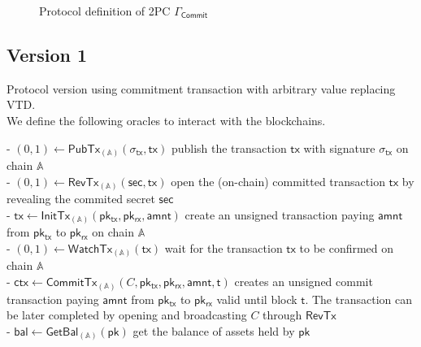 \documentclass{article}      	%
\begin{document}
\begin{figure}[H]
\begin{pchstack}
\end{pchstack}
\caption{Protocol definition of 2PC $\Gamma_{\mathsf{Commit}}$}
\end{figure}

\subsection{Version 1}

Protocol version using commitment transaction with arbitrary value replacing VTD. \\
We define the following oracles to interact with the blockchains. \\

- $(0,1) \leftarrow \mathsf{PubTx}_{(\mathbb{A})}(\sigma_{\mathsf{tx}}, \mathsf{tx})$ publish the transaction $\mathsf{tx}$ with signature $\sigma_{\mathsf{tx}}$ on chain $\mathbb{A}$ \\
- $(0,1) \leftarrow \mathsf{RevTx}_{(\mathbb{A})}(\mathsf{sec}, \mathsf{tx})$ open the (on-chain) committed transaction $\mathsf{tx}$ by revealing the commited secret $\mathsf{sec}$ \\
- $\mathsf{tx} \leftarrow \mathsf{InitTx}_{(\mathbb{A})}(\mathsf{pk_{tx}}, \mathsf{pk_{rx}}, \mathsf{amnt})$ create an unsigned transaction paying $\mathsf{amnt}$ from $\mathsf{pk_{tx}}$ to $\mathsf{pk_{rx}}$ on chain $\mathbb{A}$ \\
- $(0,1) \gets \mathsf{WatchTx}_{(\mathbb{A})}(\mathsf{tx})$ wait for the transaction $\mathsf{tx}$ to be confirmed on chain $\mathbb{A}$ \\
- $\mathsf{ctx} \leftarrow \mathsf{CommitTx}_{(\mathbb{A})}(C, \mathsf{pk_{tx}}, \mathsf{pk_{rx}}, \mathsf{amnt}, \mathsf{t})$ creates an unsigned commit transaction paying $\mathsf{amnt}$ from $\mathsf{pk_{tx}}$ to $\mathsf{pk_{rx}}$ valid until block $\mathsf{t}$. The transaction can be later completed by opening and broadcasting $C$ through $\mathsf{RevTx}$ \\
- $\mathsf{bal} \gets \mathsf{GetBal}_{(\mathbb{A})}(\mathsf{pk})$ get the balance of assets held by $\mathsf{pk}$ \\
\end{document}
